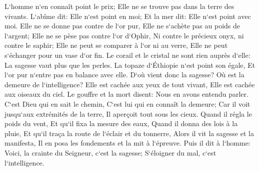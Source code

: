 \verse L`homme n`en connaît point le prix; Elle ne se trouve pas dans la terre des vivants. 
\verse L`abîme dit: Elle n`est point en moi; Et la mer dit: Elle n`est point avec moi. 
\verse Elle ne se donne pas contre de l`or pur, Elle ne s`achète pas au poids de l`argent; 
\verse Elle ne se pèse pas contre l`or d`Ophir, Ni contre le précieux onyx, ni contre le saphir; 
\verse Elle ne peut se comparer à l`or ni au verre, Elle ne peut s`échanger pour un vase d`or fin. 
\verse Le corail et le cristal ne sont rien auprès d`elle: La sagesse vaut plus que les perles. 
\verse La topaze d`Éthiopie n`est point son égale, Et l`or pur n`entre pas en balance avec elle. 
\verse D`où vient donc la sagesse? Où est la demeure de l`intelligence? 
\verse Elle est cachée aux yeux de tout vivant, Elle est cachée aux oiseaux du ciel. 
\verse Le gouffre et la mort disent: Nous en avons entendu parler. 
\verse C`est Dieu qui en sait le chemin, C`est lui qui en connaît la demeure; 
\verse Car il voit jusqu`aux extrémités de la terre, Il aperçoit tout sous les cieux. 
\verse Quand il régla le poids du vent, Et qu`il fixa la mesure des eaux, 
\verse Quand il donna des lois à la pluie, Et qu`il traça la route de l`éclair et du tonnerre, 
\verse Alors il vit la sagesse et la manifesta, Il en posa les fondements et la mit à l`épreuve. 
\verse Puis il dit à l`homme: Voici, la crainte du Seigneur, c`est la sagesse; S`éloigner du mal, c`est l`intelligence. 


